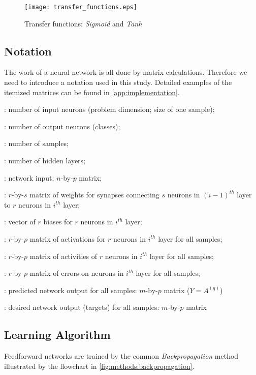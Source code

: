\begin{figure}[H]
  \centering
  \texttt{[image: transfer\_functions.eps]}
  \caption{Transfer functions: \textit{Sigmoid} and \textit{Tanh}}
  \label{fig:methods:transfer_functions}
\end{figure}

\subsection*{Notation}
The work of a neural network is all done by matrix calculations. Therefore we need to introduce a notation used in this study. Detailed examples of the itemized matrices can be found in \cref{app:implementation}.

\begin{description}[leftmargin=!,labelwidth=\widthof{\bfseries $ W^{(i)} $}]
\item[$ n $] : number of input neurons (problem dimension; size of one sample);
\item[$ m $] : number of output neurons (classes);
\item[$ p $] : number of samples;
\item[$ q $] : number of hidden layers;
\item[$ X $] : network input: $ n $-by-$ p $ matrix;
\item[$ W^{(i)} $] : $ r $-by-$ s $ matrix of weights for synapses connecting $ s $ neurons in $ (i-1)^{th} $ layer to $ r $ neurons in $ i^{th} $ layer;
\item[$ B^{(i)} $] : vector of $ r $ biases for $ r $ neurons in $ i^{th} $ layer;
\item[$ Z^{(i)} $] : $ r $-by-$ p $ matrix of activations for $ r $ neurons in $ i^{th} $ layer for all samples;
\item[$ A^{(i)} $] : $ r $-by-$ p $ matrix of activities of $ r $ neurons in $ i^{th} $ layer for all samples;
\item[$ \Delta^{(i)} $] : $ r $-by-$ p $ matrix of errors on neurons in $ i^{th} $ layer for all samples;
\item[$ Y $] : predicted network output for all samples: $ m $-by-$ p $ matrix ($ Y = A^{(q)} $)
\item[$ U $] : desired network output (targets) for all samples: $ m $-by-$ p $ matrix
\end{description}

\subsection*{Learning Algorithm}
Feedforward networks are trained by the common \textit{Backpropagation} method illustrated by the flowchart in \cref{fig:methods:backpropagation}.

